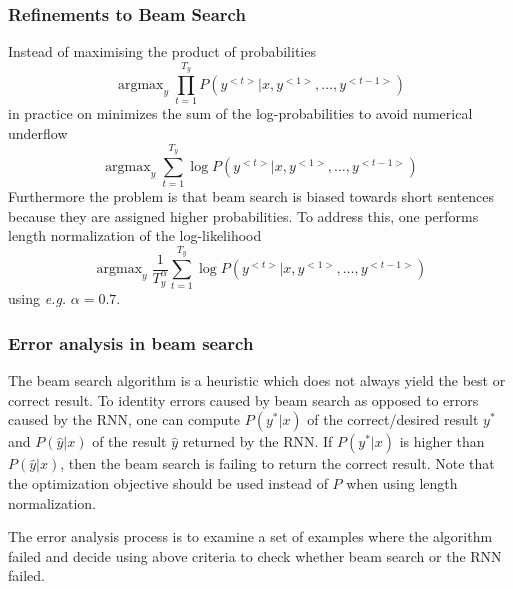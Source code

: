 \documentclass{article}
\begin{document}
\subsubsection{Refinements to Beam Search}
Instead of maximising the product of probabilities
\begin{equation}
  \mathop{\operatorname{argmax}}_y \prod_{t=1}^{T_y} P(y^{<t>}|x,y^{<1>},\ldots,y^{<t-1>})
\end{equation}
in practice on minimizes the sum of the log-probabilities to avoid numerical underflow
\begin{equation}
  \mathop{\operatorname{argmax}}_y \sum_{t=1}^{T_y} \log P(y^{<t>}|x,y^{<1>},\ldots,y^{<t-1>})
\end{equation}
Furthermore the problem is that beam search is biased towards short sentences because they are assigned higher probabilities.
To address this, one performs length normalization of the log-likelihood
\begin{equation}
  \mathop{\operatorname{argmax}}_y \frac{1}{T_y^\alpha}\sum_{t=1}^{T_y} \log P(y^{<t>}|x,y^{<1>},\ldots,y^{<t-1>})
\end{equation}
using \emph{e.g.} $\alpha=0.7$.

\subsubsection{Error analysis in beam search}
The beam search algorithm is a heuristic which does not always yield the best or correct result.
To identity errors caused by beam search as opposed to errors caused by the RNN,
one can compute $P(y^*|x)$ of the correct/desired result $y^*$ and $P(\hat{y}|x)$ of the result $\hat{y}$ returned by the RNN.
If $P(y^*|x)$ is higher than $P(\hat{y}|x)$, then the beam search is failing to return the correct result.
Note that the optimization objective should be used instead of $P$ when using length normalization.

The error analysis process is to examine a set of examples where the algorithm failed and decide using above criteria
to check whether beam search or the RNN failed.
\end{document}
